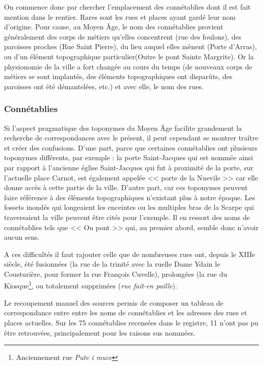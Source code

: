 On commence donc par chercher l'emplacement des connétablies dont il est fait mention dans le rentier. Rares sont les rues et places ayant gardé leur nom d'origine. Pour cause, au Moyen Âge, le nom des connétablies provient généralement des corps de métiers qu'elles concentrent (rue des foulons), des paroisses proches (Rue Saint Pierre),  du lieu auquel elles mènent (Porte d'Arras), ou d'un élément topographique particulier(Outre le pont Sainte Margrite). Or la physionomie de la ville  a fort changée  au cours du temps (de nouveaux corps de métiers se sont implantés, des éléments topographiques ont disparûts, des paroisses ont été démantelées, etc.) et avec elle, le nom des rues.

\subsubsection{Connétablies}
Si l'aspect pragmatique des toponymes du Moyen Âge facilite grandement la recherche de correspondances avec le présent, il peut cependant se montrer traître  et créer des confusions. D'une part, parce que certaines connétablies ont plusieurs toponymes différents, par exemple : la porte Saint-Jacques qui est nommée ainsi par rapport à l'ancienne église Saint-Jacques qui fut à proximité de la porte, sur l'actuelle place Carnot, est également appelée << porte de la Nuevile >> car elle donne accès à cette partie de la ville. D'autre part, car ces toponymes peuvent faire référence à des éléments topographiques n'existant plus à notre époque. Les fossets inondés qui longeaient les enceintes ou les multiples bras de la Scarpe qui traversaient la ville peuvent être cités pour l'exemple. Il en ressort des noms de connétablies tels que << Ou pont >> qui, au premier abord, semble donc n'avoir aucun sens.

A ces difficultés il faut rajouter celle que de nombreuses rues ont, depuis le XIIIe siècle, été fusionnées (la rue de la trinité  avec la ruelle Dame Ydain le Cousturière,  pour former la rue François Cuvelle), prolongées (la rue du Kiosque\footnote{Anciennement  rue \textit{Pute i muce}}, ou totalement supprimées (\textit{rue fait-en paille}).

Le recoupement manuel des sources permis de composer un tableau de correspondance entre entre les noms de connétablies et les adresses des rues et places actuelles.
Sur les 75 connétablies recensées dans le registre, 11 n'ont pas pu être retrouvées, principalement pour les raisons sus nommées. 

